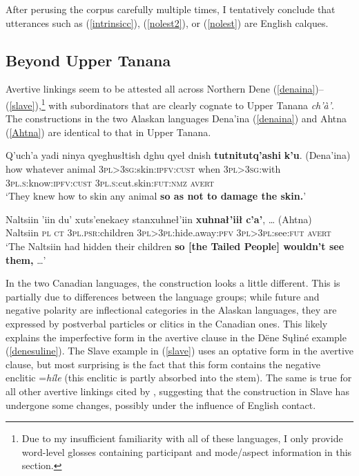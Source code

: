 \documentclass[output=paper,colorlinks,citecolor=brown
]{langscibook}
\begin{document}
After perusing the corpus carefully multiple times, I tentatively conclude that utterances such as (\ref{intrinsicc}), (\ref{nolest2}), or (\ref{nolest}) are English calques.


\subsection{Beyond Upper Tanana}
\label{subsection:avert-beyond}

Avertive linkings seem to be attested all across Northern Dene (\ref{denaina})--(\ref{slave}),\footnote{Due to my insufficient familiarity with all of these languages, I only provide word-level glosses containing participant and mode/aspect information in this section.} with subordinators that are clearly cognate to Upper Tanana \textit{ch'à'}. The constructions in the two Alaskan languages Dena'ina (\ref{denaina}) and Ahtna (\ref{Ahtna}) are identical to that in Upper Tanana.

\ea \label{denaina}
\gll  Q'uch'a yadi ninya qyeghusłtish dghu qyeł dnish \textbf{tutnitutq'ashi} \textbf{k'u}. \textnormal{(Dena'ina)} \\
how whatever animal \textsc{3pl>3sg}:skin:\textsc{ipfv:cust} when \textsc{3pl>3sg}:with \textsc{3pl.s}:know:\textsc{ipfv:cust} \textsc{3pl.s}:cut.skin:\textsc{fut:nmz} \textsc{avert} \\
\glt `They knew how to skin any animal \textbf{so as not to damage the skin.}' \\ 
\hfill \citep[260--261]{KalifornskyP1991}
\z

\ea \label{Ahtna}
\gll  Naltsiin 'iin du' xuts'enekaey stanxuhneł'iin \textbf{xuhnał'iił} \textbf{c'a'},  {\ldots} \textnormal{(Ahtna)} \\
Naltsiin \textsc{pl} \textsc{ct} \textsc{3pl.psr}:children \textsc{3pl>3pl}:hide.away:\textsc{pfv} \textsc{3pl>3pl}:see:\textsc{fut} \textsc{avert} \\
\glt `The Naltsiin had hidden their children \textbf{so [the Tailed People] wouldn't see them,}  \ldots' \hfill \citep[55]{KariJ1986}
\z


 In the two Canadian languages, the construction looks a little different. This is partially due to differences between the language groups; while future and negative polarity are inflectional categories in the Alaskan languages, they are expressed by postverbal particles or clitics in the Canadian ones. This likely explains the imperfective form in the avertive clause in the Dëne Sųłiné example (\ref{denesuline}). The Slave example in (\ref{slave}) uses an optative form in the avertive clause, but most surprising is the fact that this form contains the negative enclitic =\textit{híle} (this enclitic is partly absorbed into the stem). The same is true for all other avertive linkings cited by \citet{RiceK1989}, suggesting that the construction in Slave has undergone some changes, possibly under the influence of English contact.
\end{document}
